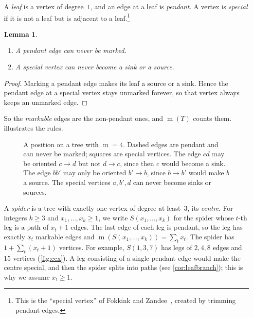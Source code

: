 \documentclass[11pt]{amsart}
\newtheorem{lemma}[theorem]{Lemma}
\theoremstyle{definition}
\theoremstyle{remark}
\newcommand{\m}{\operatorname{m}}
\newcommand{\Sp}{S}
\begin{document}
A \emph{leaf} is a vertex of degree~$1$, and an edge at a leaf is \emph{pendant}. A vertex is \emph{special} if it is not a leaf but is adjacent to a leaf.\footnote{This is the ``special vertex'' of Fokkink and Zandee~\cite{Fokkink2024}, created by trimming pendant edges.}

\begin{lemma}\label{lem:pendant}
\begin{enumerate}[label=\textup{(\alph*)}]
\item A pendant edge can never be marked.
\item A special vertex can never become a sink or a source.
\end{enumerate}
\end{lemma}
\begin{proof}
Marking a pendant edge makes its leaf a source or a sink. Hence the pendant edge at a special vertex stays unmarked forever, so that vertex always keeps an unmarked edge.
\end{proof}

So the \emph{markable} edges are the non-pendant ones, and $\m(T)$ counts them.  illustrates the rules.

\begin{figure}[t]
\centering
{}
\caption{A position on a tree with $\m=4$. Dashed edges are pendant and can never be marked; squares are special vertices. The edge $cd$ may be oriented $c\to d$ but not $d\to c$, since then $c$ would become a sink. The edge $bb'$ may only be oriented $b'\to b$, since $b\to b'$ would make $b$ a source. The special vertices $a,b',d$ can never become sinks or sources.}
\label{fig:rules}
\end{figure}

A \emph{spider} is a tree with exactly one vertex of degree at least~$3$, its \emph{centre}. For integers $k\ge3$ and $x_1,\dots,x_k\ge1$, we write $\Sp(x_1,\dots,x_k)$ for the spider whose $t$-th leg is a path of $x_t+1$ edges. The last edge of each leg is pendant, so the leg has exactly $x_t$ markable edges and $\m(\Sp(x_1,\dots,x_k))=\sum_t x_t$. The spider has $1+\sum_t (x_t+1)$ vertices. For example, $\Sp(1,3,7)$ has legs of $2,4,8$ edges and $15$ vertices (\cref{fig:cex}). A leg consisting of a single pendant edge would make the centre special, and then the spider splits into paths (see \cref{cor:leafbranch}); this is why we assume $x_t\ge 1$.
\end{document}

